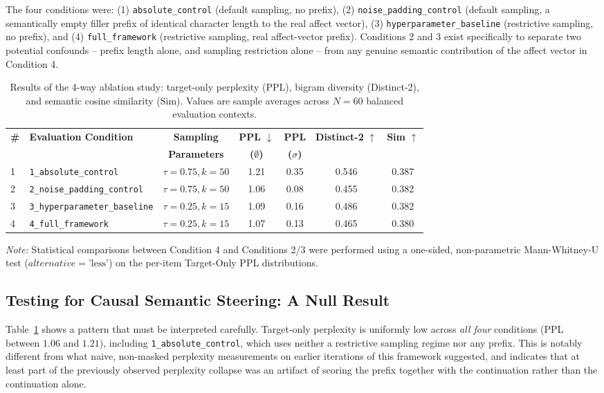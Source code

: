 \documentclass[10pt,twocolumn]{article}
\begin{document}
The four conditions were: (1) \texttt{absolute\_control} (default sampling, no prefix), (2) \texttt{noise\_padding\_control} (default sampling, a semantically empty filler prefix of identical character length to the real affect vector), (3) \texttt{hyperparameter\_baseline} (restrictive sampling, no prefix), and (4) \texttt{full\_framework} (restrictive sampling, real affect-vector prefix). Conditions 2 and 3 exist specifically to separate two potential confounds -- prefix length alone, and sampling restriction alone -- from any genuine semantic contribution of the affect vector in Condition 4.

\begin{table}[t]
\footnotesize
\setlength{\tabcolsep}{3pt}
\caption{Results of the 4-way ablation study: target-only perplexity (PPL), bigram diversity (Distinct-2), and semantic cosine similarity (Sim). Values are sample averages across $N=60$ balanced evaluation contexts.}
\label{tab:ablation_results}
\begin{center}
\begin{tabular}{llccccc}
\hline
\textbf{\#} & \textbf{Evaluation Condition} & \textbf{Sampling} & \textbf{PPL} $\downarrow$ & \textbf{PPL} & \textbf{Distinct-2} $\uparrow$ & \textbf{Sim} $\uparrow$ \\
& & \textbf{Parameters} & \textbf{($\emptyset$)} & \textbf{($\sigma$)} & & \\
\hline
1 & \texttt{1\_absolute\_control}       & $\tau=0.75, k=50$ & 1.21 & 0.35 & 0.546 & 0.387 \\
2 & \texttt{2\_noise\_padding\_control} & $\tau=0.75, k=50$ & 1.06 & 0.08 & 0.455 & 0.382 \\
3 & \texttt{3\_hyperparameter\_baseline} & $\tau=0.25, k=15$ & 1.09 & 0.16 & 0.486 & 0.382 \\
4 & \texttt{4\_full\_framework}         & $\tau=0.25, k=15$ & 1.07 & 0.13 & 0.465 & 0.380 \\
\hline
\end{tabular}
\end{center}
\small \textit{Note:} Statistical comparisons between Condition 4 and Conditions 2/3 were performed using a one-sided, non-parametric Mann-Whitney-U test ($alternative=\text{'less'}$) on the per-item Target-Only PPL distributions.
\end{table}

\subsection{Testing for Causal Semantic Steering: A Null Result}
Table~\ref{tab:ablation_results} shows a pattern that must be interpreted carefully. Target-only perplexity is uniformly low across \emph{all four} conditions (PPL between $1.06$ and $1.21$), including \texttt{1\_absolute\_control}, which uses neither a restrictive sampling regime nor any prefix. This is notably different from what naive, non-masked perplexity measurements on earlier iterations of this framework suggested, and indicates that at least part of the previously observed perplexity collapse was an artifact of scoring the prefix together with the continuation rather than the continuation alone.
\end{document}
